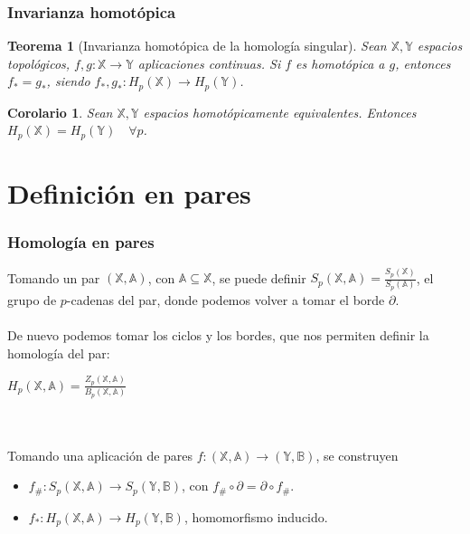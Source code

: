 \documentclass{beamer}
\def\X{{\mathbb X}}
\def\A{{\mathbb A}}
\def\Y{{\mathbb Y}}
\def\B{{\mathbb B}}
\theoremstyle{theorem}
\newtheorem{mytheorem}{Teorema}
\newtheorem{mycorollary}{Corolario}
\begin{document}

\begin{frame}
  \frametitle{Invarianza homotópica}

  \begin{mytheorem}[Invarianza homotópica de la homología singular]
    Sean $\X, \Y$ espacios topológicos, $f, g \colon \X \to \Y$ aplicaciones continuas. Si $f$ es homotópica a $g$,
    entonces $f_* = g_*$, siendo $f_*, g_* \colon H_p(\X) \to H_p(\Y)$.
  \end{mytheorem}

  \begin{mycorollary}
    Sean $\X, \Y$ espacios homotópicamente equivalentes. Entonces $H_p(\X) = H_p(\Y) \quad \forall p$.
  \end{mycorollary}

\end{frame}


\section{Definición en pares}

\begin{frame}
  \frametitle{Homología en pares}
  Tomando un par $(\X, \A)$, con $\A \subseteq \X$, se puede definir $S_p(\X, \A) = \frac{S_p(\X)}{S_p(\A)}$,
  el grupo de $p$-cadenas del par, donde podemos volver a tomar el borde $\partial$. \\~\\

  De nuevo podemos tomar los ciclos y los bordes, que nos permiten definir la homología del par:
  \centerline{$H_p(\X, \A) = \frac{Z_p(\X, \A)}{B_p(\X, \A)}$} \\~\\

  Tomando una aplicación de pares $f \colon (\X, \A) \to (\Y, \B)$, se construyen
  \begin{itemize}
    \item $f_\# \colon S_p(\X, \A) \to S_p(\Y, \B)$, con $f_\# \circ \partial = \partial \circ f_\#$.
    \item $f_* \colon H_p(\X, \A) \to H_p(\Y, \B)$, homomorfismo inducido.
  \end{itemize}

\end{frame}

\end{document}
